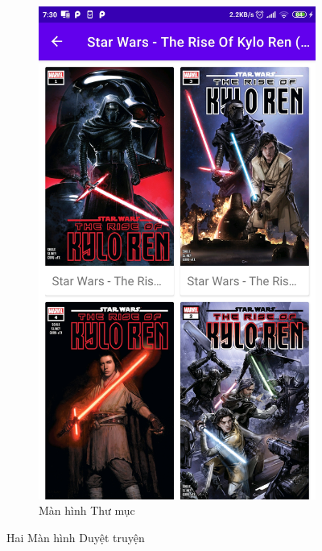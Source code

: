\documentclass[../../thesis]{subfiles}
\begin{document}
\begin{figure}[H]
    \begin{subfigure}[b]{0.328\textwidth}
        \centering
        \includegraphics[scale=0.12]{../images/Screenshot_2021-05-25-07-30-42-216_com.uet.nvmnghia.yacv}
        \caption{Màn hình Thư mục}
        \label{fig:folder_screen}
    \end{subfigure}
    \caption{Hai Màn hình Duyệt truyện}
    \label{fig:2-browsing-screens}
\end{figure}
\end{document}
